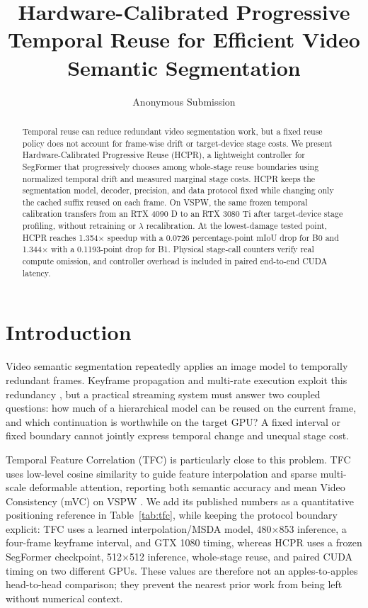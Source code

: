 \documentclass[runningheads]{llncs}
\begin{document}
\title{Hardware-Calibrated Progressive Temporal Reuse for Efficient Video Semantic Segmentation}
\author{Anonymous Submission}

\maketitle

\begin{abstract}
Temporal reuse can reduce redundant video segmentation work, but a fixed reuse policy does not account for frame-wise drift or target-device stage costs. We present Hardware-Calibrated Progressive Reuse (HCPR), a lightweight controller for SegFormer that progressively chooses among whole-stage reuse boundaries using normalized temporal drift and measured marginal stage costs. HCPR keeps the segmentation model, decoder, precision, and data protocol fixed while changing only the cached suffix reused on each frame. On VSPW, the same frozen temporal calibration transfers from an RTX 4090 D to an RTX 3080 Ti after target-device stage profiling, without retraining or $\lambda$ recalibration. At the lowest-damage tested point, HCPR reaches 1.354$\times$ speedup with a 0.0726 percentage-point mIoU drop for B0 and 1.344$\times$ with a 0.1193-point drop for B1. Physical stage-call counters verify real compute omission, and controller overhead is included in paired end-to-end CUDA latency.
\end{abstract}

\section{Introduction}
Video semantic segmentation repeatedly applies an image model to temporally redundant frames. Keyframe propagation and multi-rate execution exploit this redundancy \cite{zhu2017dff,shelhamer2016clockwork,jain2019accel}, but a practical streaming system must answer two coupled questions: how much of a hierarchical model can be reused on the current frame, and which continuation is worthwhile on the target GPU? A fixed interval or fixed boundary cannot jointly express temporal change and unequal stage cost.

Temporal Feature Correlation (TFC) is particularly close to this problem. TFC uses low-level cosine similarity to guide feature interpolation and sparse multi-scale deformable attention, reporting both semantic accuracy and mean Video Consistency (mVC) on VSPW \cite{lin2024tfc}. We add its published numbers as a quantitative positioning reference in Table~\ref{tab:tfc}, while keeping the protocol boundary explicit: TFC uses a learned interpolation/MSDA model, 480$\times$853 inference, a four-frame keyframe interval, and GTX 1080 timing, whereas HCPR uses a frozen SegFormer checkpoint, 512$\times$512 inference, whole-stage reuse, and paired CUDA timing on two different GPUs. These values are therefore not an apples-to-apples head-to-head comparison; they prevent the nearest prior work from being left without numerical context.
\end{document}
